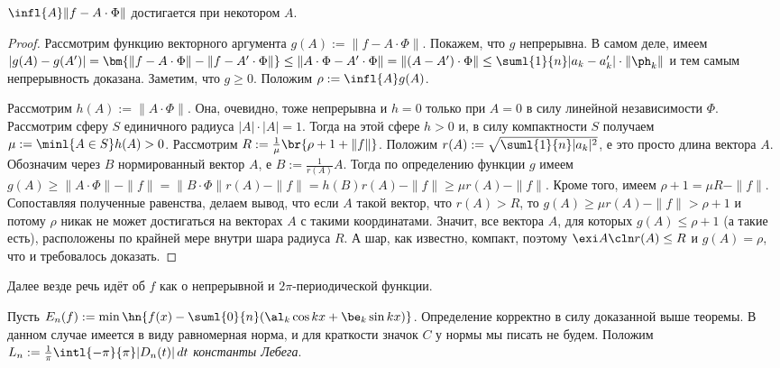 \documentclass[a4paper]{article}
\newcommand{\intlpp}{\intl{-\pi}{\pi}}
\newcommand{\frpi}{\frac{1}{\pi}}
\begin{document}
\begin{theorem}
$\infl{A} \|f-A\cdot \Phi\|$ достигается при некотором $A$.
\end{theorem}
\begin{proof}
Рассмотрим функцию векторного аргумента $g(A) := \|f-A\cdot \Phi\|$. Покажем, что $g$ непрерывна. В самом деле,
имеем $|g(A)-g(A')| = \bm{\|f-A\cdot \Phi\| - \|f - A'\cdot \Phi\|} \le \|A\cdot\Phi - A'\cdot\Phi\| = \|(A-A')\cdot\Phi\| \le \suml{1}{n}|a_k - a_k'|\cdot\|\ph_k\|$
и тем самым непрерывность доказана. Заметим, что $g \ge 0$. Положим $\rho := \infl{A} g(A)$.

Рассмотрим $h(A) := \|A\cdot \Phi\|$. Она, очевидно, тоже непрерывна и $h = 0$ только при $A = 0$ в силу линейной независимости $\Phi$.
Рассмотрим сферу $S$ единичного радиуса $|A|\cdot|A| = 1$. Тогда на этой сфере $h > 0$ и, в силу компактности $S$ получаем $\mu := \minl{A \in S} h(A) > 0$.
Рассмотрим $R := \frac{1}{\mu}\br{\rho + 1 + \|f\|}$. Положим $r(A) := \sqrt{\suml{1}{n}|a_k|^2}$, е это просто длина вектора $A$.
Обозначим через $B$ нормированный вектор $A$, е $B := \frac{1}{r(A)}A$. Тогда по определению функции $g$ имеем
$g(A) \ge \|A\cdot\Phi\| - \|f\| = \|B\cdot\Phi\| r(A) - \|f\| = h(B)r(A) - \|f\| \ge \mu r(A) - \|f\|$. Кроме того,
имеем $\rho + 1 = \mu R - \|f\|$. Сопоставляя полученные равенства, делаем вывод, что если $A$ такой вектор, что $r(A) > R$, то
$g(A) \ge \mu r(A) - \|f\| > \rho + 1$ и потому $\rho$ никак не может достигаться на векторах $A$ с такими координатами. Значит,
все вектора $A$, для которых $g(A) \le \rho + 1$ (а такие есть), расположены по крайней мере внутри шара радиуса $R$. А шар, как известно, компакт,
поэтому $\exi A\cln r(A) \le R$ и $g(A) = \rho$, что и требовалось доказать.
\end{proof}

\begin{note}
Далее везде речь идёт об $f$ как о непрерывной и $2\pi$-периодической функции.
\end{note}

Пусть $E_n(f) := \min \hn{f(x) - \suml{0}{n}(\al_k\cos kx + \be_k \sin kx)}$. Определение корректно
в силу доказанной выше теоремы. В данном случае имеется в виду равномерная норма, и для краткости
значок $C$ у нормы мы писать не будем. Положим $L_n := \frpi \intlpp|D_n(t)|\,d t$
\emph{константы Лебега}.
\end{document}
